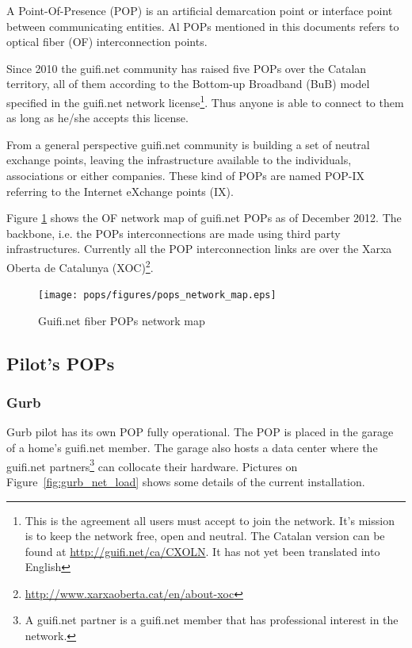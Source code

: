 A Point-Of-Presence (POP) is an artificial demarcation point or interface point between communicating entities. Al POPs mentioned in this documents refers to optical fiber (OF) interconnection points.

Since 2010 the guifi.net community has raised five POPs over the Catalan territory, all of them according to the Bottom-up Broadband (BuB) model specified in the guifi.net network license\footnote{This is the agreement all users must accept to join the network. It's mission is to keep the network free, open and neutral. The Catalan version can be found at \url{http://guifi.net/ca/CXOLN}. It has not yet been translated into English}.
Thus anyone is able to connect to them as long as he/she accepts this license.

From a general perspective guifi.net community is building a set of neutral exchange points, leaving the infrastructure available to the individuals, associations or either companies. These kind of POPs are named POP-IX referring to the Internet eXchange points (IX).

Figure \ref{fig:fibre_map} shows the OF network map of guifi.net POPs as of December 2012. The backbone, i.e. the POPs interconnections are made using third party infrastructures. Currently all the POP interconnection links are over the Xarxa Oberta de Catalunya (XOC)\footnote{\url{http://www.xarxaoberta.cat/en/about-xoc}}.

\begin{figure}[htbp]
  \centering
  \texttt{[image: pops/figures/pops\_network\_map.eps]} 
  \caption{Guifi.net fiber POPs network map}
  \label{fig:fibre_map}
\end{figure}


\FloatBarrier
\subsection{Pilot's POPs}

\FloatBarrier
\subsubsection{Gurb}
Gurb pilot has its own POP fully operational. The POP is placed in the garage of a home's guifi.net member. The garage also hosts a data center where the guifi.net partners\footnote{A guifi.net partner is a guifi.net member that has professional interest in the network.} can collocate their hardware. Pictures on Figure~\ref{fig:gurb_net_load} shows some details of the current installation.


